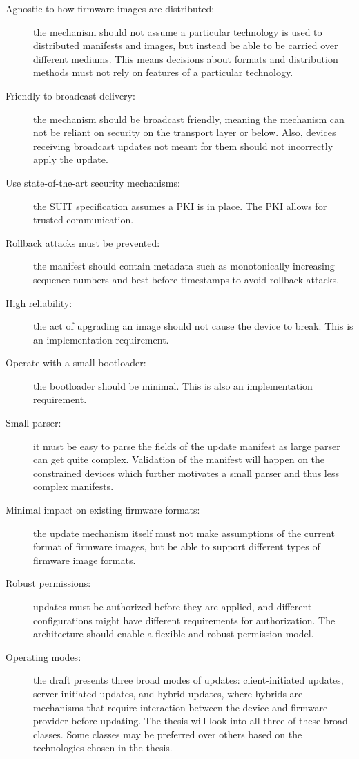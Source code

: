 \documentclass[0-thesis.tex]{subfiles}
\begin{document}
\begin{description}
    \item [Agnostic to how firmware images are distributed:]
            the mechanism should not assume a particular technology is used to distributed
            manifests and images, but instead be able to be carried over different
            mediums. This means decisions about formats and distribution methods must not
            rely on features of a particular technology.
    \item [Friendly to broadcast delivery:]
            the mechanism should be broadcast friendly, meaning the mechanism can not be
            reliant on security on the transport layer or below. Also, devices receiving
            broadcast updates not meant for them should not incorrectly apply the update.
    \item [Use state-of-the-art security mechanisms:]
            the SUIT specification assumes a PKI is in place. The PKI allows for
            trusted communication.
    \item [Rollback attacks must be prevented:]
            the manifest should contain metadata such as monotonically increasing sequence
            numbers and best-before timestamps to avoid rollback attacks.
    \item [High reliability:]
            the act of upgrading an image should not cause the device to break. This is an
            implementation requirement. 
    \item [Operate with a small bootloader:]
            the bootloader should be minimal. This is also an implementation requirement. 
    \item [Small parser:]
            it must be easy to parse the fields of the update manifest as large parser can
            get quite complex. Validation of the manifest will happen on the constrained
            devices which further motivates a small parser and thus less complex
            manifests.
    \item [Minimal impact on existing firmware formats:]
            the update mechanism itself must not make assumptions of the current format of
            firmware images, but be able to support different types of firmware image
            formats.
    \item [Robust permissions:]
            updates must be authorized before they are applied, and different
            configurations might have different requirements for authorization. The
            architecture should enable a flexible and robust permission model.
    \item [Operating modes:]
            the draft presents three broad modes of updates: client-initiated updates,
            server-initiated updates, and hybrid updates, where hybrids are mechanisms
            that require interaction between the device and firmware provider before
            updating. The thesis will look into all three of these broad classes. Some
            classes may be preferred over others based on the technologies chosen in the
            thesis.
\end{description}
\end{document}
